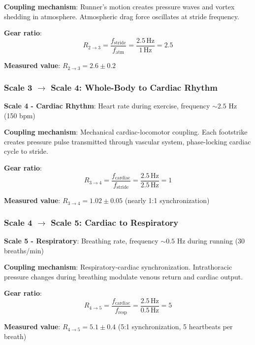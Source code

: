 \documentclass[11pt,onecolumn]{article}
\begin{document}
\textbf{Coupling mechanism}: Runner's motion creates pressure waves and vortex shedding in atmosphere. Atmospheric drag force oscillates at stride frequency.

\textbf{Gear ratio}:
\begin{equation}
R_{2 \to 3} = \frac{f_{\text{stride}}}{f_{\text{atm}}} = \frac{2.5\,\text{Hz}}{1\,\text{Hz}} = 2.5
\end{equation}

\textbf{Measured value}: $R_{2 \to 3} = 2.6 \pm 0.2$

\subsubsection{Scale 3 $\to$ Scale 4: Whole-Body to Cardiac Rhythm}

\textbf{Scale 4 - Cardiac Rhythm}: Heart rate during exercise, frequency $\sim 2.5$ Hz (150 bpm)

\textbf{Coupling mechanism}: Mechanical cardiac-locomotor coupling. Each footstrike creates pressure pulse transmitted through vascular system, phase-locking cardiac cycle to stride.

\textbf{Gear ratio}:
\begin{equation}
R_{3 \to 4} = \frac{f_{\text{cardiac}}}{f_{\text{stride}}} = \frac{2.5\,\text{Hz}}{2.5\,\text{Hz}} = 1
\end{equation}

\textbf{Measured value}: $R_{3 \to 4} = 1.02 \pm 0.05$ (nearly 1:1 synchronization)

\subsubsection{Scale 4 $\to$ Scale 5: Cardiac to Respiratory}

\textbf{Scale 5 - Respiratory}: Breathing rate, frequency $\sim 0.5$ Hz during running (30 breaths/min)

\textbf{Coupling mechanism}: Respiratory-cardiac synchronization. Intrathoracic pressure changes during breathing modulate venous return and cardiac output.

\textbf{Gear ratio}:
\begin{equation}
R_{4 \to 5} = \frac{f_{\text{cardiac}}}{f_{\text{resp}}} = \frac{2.5\,\text{Hz}}{0.5\,\text{Hz}} = 5
\end{equation}

\textbf{Measured value}: $R_{4 \to 5} = 5.1 \pm 0.4$ (5:1 synchronization, 5 heartbeats per breath)
\end{document}
